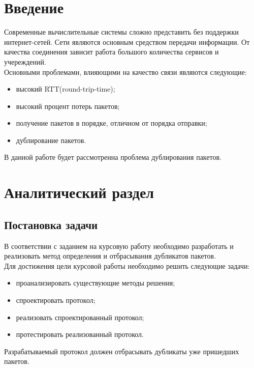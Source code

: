 \documentclass[14pt, a4paper]{extarticle}
\begin{document}
{ }
\setcounter{page}{3}

\clearpage
\tableofcontents

\clearpage
\section*{Введение}
	Современные вычислительные системы сложно представить без поддержки интернет-сетей. Сети являются основным средством передачи информации. От качества соединения зависит работа большого количества сервисов и учереждений.\\
\indent Основными проблемами, влияющими на качество связи являются следующие:
\begin{itemize}
	\item высокий RTT(round-trip-time)\cite{quality};
	\item высокий процент потерь пакетов;
	\item получение пакетов в порядке, отличном от порядка отправки;
	\item дублирование пакетов.
\end{itemize}
\indent В данной работе будет рассмотренна проблема дублирования пакетов.

\clearpage
\section{Аналитический раздел}
\subsection{Постановка задачи}
В соответствии с заданием на курсовую работу необходимо разработать и реализовать метод определения и отбрасывания дубликатов пакетов. \\
\indent Для достижения цели курсовой работы необходимо решить следующие задачи:
\begin{itemize}
	\item проанализировать существующие методы решения;
	\item спроектировать протокол;
	\item реализовать спроектированный протокол;
	\item протестировать реализованный протокол.
\end{itemize}
\indent Разрабатываемый протокол должен отбрасывать дубликаты уже пришедших пакетов.
\end{document}
